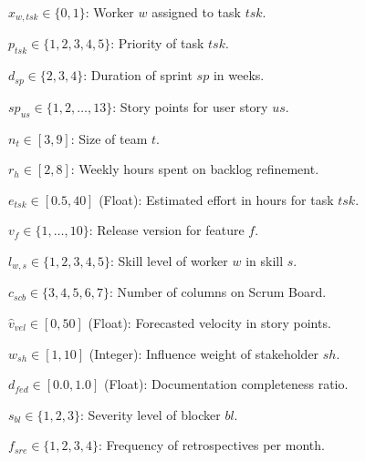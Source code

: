 \documentclass[12pt]{article}
\begin{document}
\item $x_{w,tsk} \in \{0,1\}$: Worker $w$ assigned to task $tsk$.
    \item $p_{tsk} \in \{1,2,3,4,5\}$: Priority of task $tsk$.
    \item $d_{sp} \in \{2,3,4\}$: Duration of sprint $sp$ in weeks.
    \item $sp_{us} \in \{1,2,\dots,13\}$: Story points for user story $us$.
    \item $n_t \in [3,9]$: Size of team $t$.
    \item $r_h \in [2,8]$: Weekly hours spent on backlog refinement.
    \item $e_{tsk} \in [0.5, 40]$ (Float): Estimated effort in hours for task $tsk$.
    \item $v_f \in \{1,\dots,10\}$: Release version for feature $f$.
    \item $l_{w,s} \in \{1,2,3,4,5\}$: Skill level of worker $w$ in skill $s$.
    \item $c_{scb} \in \{3,4,5,6,7\}$: Number of columns on Scrum Board.
    \item $\hat{v}_{vel} \in [0, 50]$ (Float): Forecasted velocity in story points.
    \item $w_{sh} \in [1,10]$ (Integer): Influence weight of stakeholder $sh$.
    \item $d_{fed} \in [0.0, 1.0]$ (Float): Documentation completeness ratio.
    \item $s_{bl} \in \{1,2,3\}$: Severity level of blocker $bl$.
    \item $f_{sre} \in \{1,2,3,4\}$: Frequency of retrospectives per month.
\end{document}
